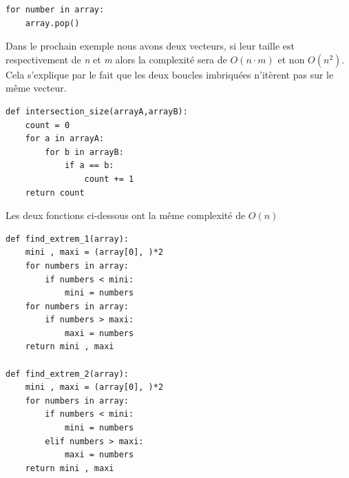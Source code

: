 \documentclass{article}
\begin{document}
\begin{lstlisting}
for number in array:
    array.pop()
\end{lstlisting}

Dans le prochain exemple nous avons deux vecteurs, si leur taille est respectivement de \emph{n} et \emph{m} alors la complexité sera de $O(n \cdot m)$ et non $O(n^2)$. Cela s'explique par le fait que les deux boucles imbriquées n'itèrent pas sur le même vecteur.

\begin{lstlisting}
def intersection_size(arrayA,arrayB):
    count = 0
    for a in arrayA:
        for b in arrayB:
            if a == b:
                count += 1
    return count
\end{lstlisting}

Les deux fonctions ci-dessous ont la même complexité de $O(n)$

\begin{lstlisting}
def find_extrem_1(array):
    mini , maxi = (array[0], )*2   
    for numbers in array:          
        if numbers < mini:
            mini = numbers
    for numbers in array:          
        if numbers > maxi: 
            maxi = numbers
    return mini , maxi

def find_extrem_2(array):
    mini , maxi = (array[0], )*2   
    for numbers in array:          
        if numbers < mini:
            mini = numbers
        elif numbers > maxi:
            maxi = numbers
    return mini , maxi
\end{lstlisting}
\end{document}
